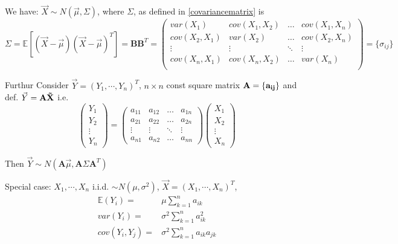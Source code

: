     
    We have: $\vec{X}\sim N(\vec{\mu},\Sigma)$, where $\Sigma$, as defined in \autoref{covariancematrix} is
    \begin{equation}
        \Sigma=\mathbb{E}[(\vec{X}-\vec{\mu})(\vec{X}-\vec{\mu})^T]=\bm{BB}^T=
        \begin{pmatrix}
        var(X_1) & cov(X_1,X_2) & \ldots & cov(X_1,X_n)\\
        cov(X_2,X_1) & var(X_2) & \ldots & cov(X_2,X_n)\\
        \vdots & \vdots & \ddots & \vdots\\
        cov(X_n,X_1) & cov(X_n,X_2) & \ldots & var(X_n)\\
        \end{pmatrix}  
        =\{\sigma_{ij}\}  
    \end{equation}

    Furthur Consider $\vec{Y}=(Y_1,\cdots,Y_n)^T$, $n\times n$ const square matrix $\bf{A}=\{a_{ij}\}$ and def. $\vec{Y}=\bf{A}\vec{X}$ i.e.
    \begin{equation}
        \begin{pmatrix}
            Y_1\\
            Y_2\\
            \vdots\\
            Y_n
        \end{pmatrix}
        =
        \begin{pmatrix}
            a_{11}&a_{12}&\ldots&a_{1n}\\
            a_{21}&a_{22}&\ldots&a_{2n}\\
            \vdots&\vdots&\ddots&\vdots\\
            a_{n1}&a_{n2}&\ldots&a_{nn}
        \end{pmatrix}
        \begin{pmatrix}
            X_1\\
            X_2\\
            \vdots\\
            X_n
        \end{pmatrix}
    \end{equation}

    Then $\vec{Y}\sim N(\bm{A}\vec{\mu},\bm{A}\Sigma\bm{A}^T)$

    Special case: $X_1,\cdots,X_n$ i.i.d. $\sim N(\mu,\sigma^2)$, $\vec{X}=(X_1,\cdots,X_n)^T$, 
    \begin{align*}
        \mathbb{E}(Y_i)=&\mu\sum_{k=1}^n a_{ik}\\
        var(Y_i)=&\sigma^2\sum_{k=1}^n a_{ik}^2\\
        cov(Y_i,Y_j)=&\sigma^2\sum_{k=1}^n a_{ik} a_{jk}
    \end{align*}

